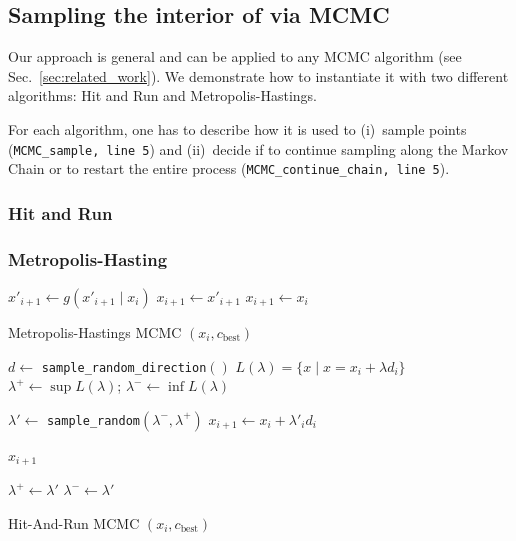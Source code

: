 \documentclass[letterpaper, 10 pt, conference]{ieeeconf}  %
\begin{document}
\subsection{Sampling the interior of \Cinf via MCMC}
\label{subsec:mcmc}

Our approach is general and can be applied to any MCMC algorithm (see Sec.~\ref{sec:related_work}).
We demonstrate how to instantiate it with two different algorithms: 
Hit and Run and Metropolis-Hastings.

For each algorithm, 
one has to describe how it is used to (i)~sample points 
(\texttt{MCMC\_sample, line 5})
and 
(ii)~decide if to continue sampling along the Markov Chain or to restart the entire process 
(\texttt{MCMC\_continue\_chain, line 5}).
 
\subsubsection{Hit and Run}

\subsubsection{Metropolis-Hasting}

\begin{algorithm}[t]
	\begin{algorithmic}[1]
		\STATE $ x'_{i+1} \leftarrow g( x'_{i+1} \mid x_{i} ) $
		  \STATE $ x_{i+1} \leftarrow x'_{i+1} $ 
		\ELSE
		  \STATE $ x_{i+1} \leftarrow x_{i} $
		\ENDIF 
	\end{algorithmic}
	\caption{Metropolis-Hastings MCMC $(x_{i}, c_{\text{best}})$}
	\label{alg:mh_mcmc}	
\end{algorithm}



\begin{algorithm}[t]
	\begin{algorithmic}[1]
		\STATE $d \leftarrow$ \texttt{sample\_random\_direction}$()$
		\STATE $ L(\lambda) = \{  x \mid x = x_i + \lambda d_i \} $
		\STATE $ \lambda^{+} \leftarrow \sup L(\lambda) $; 
				\hspace{3mm} 
			   $ \lambda^{-} \leftarrow \inf L(\lambda) $
			   
		\LOOP


		\STATE $ \lambda' \leftarrow$ \texttt{sample\_random}$ (\lambda^{-} , \lambda^{+})$
		\STATE $ x_{i+1} \leftarrow x_{i} + \lambda'_{i} d_i $
		
		  \RETURN $ x_{i+1}$
		\ENDIF


			\STATE $ \lambda^{+} \leftarrow \lambda' $
		\ELSE
			\STATE $ \lambda^{-} \leftarrow \lambda'$
		\ENDIF
		
		\ENDLOOP
  	\end{algorithmic}
	\caption{Hit-And-Run MCMC $(x_{i}, c_{\text{best}})$}
	\label{alg:hit_and_run_mcmc}	
\end{algorithm}
\end{document}
